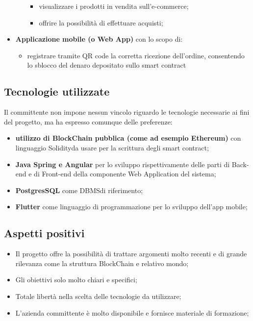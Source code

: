 \begin{itemize}
\begin{itemize}
			\begin{itemize}
				\item visualizzare i prodotti in vendita sull'e-commerce;
				\item offrire la possibilità di effettuare acquisti;
			\end{itemize}
		\end{itemize}
	\item \textbf{Applicazione mobile (o Web App)} con lo scopo di:
		\begin{itemize}
			\item registrare tramite QR code la corretta ricezione dell'ordine, consentendo lo sblocco del denaro depositato sullo smart contract
		\end{itemize}
\end{itemize}

\subsection{Tecnologie utilizzate}
Il committente non impone nessun vincolo riguardo le tecnologie necessarie ai fini del progetto, ma ha espresso comunque delle preferenze:
\begin{itemize}
	\item \textbf{utilizzo di BlockChain pubblica (come ad esempio Ethereum\glo)} con linguaggio Solidity\glo da usare per la scrittura degli {smart contract}\glo;
	\item \textbf{Java Spring e Angular} per lo sviluppo rispettivamente delle parti di Back-end e di Front-end della componente Web Application del sistema;
	\item \textbf{PostgresSQL} come DBMS\glo di riferimento;
	\item \textbf{Flutter} come linguaggio di programmazione per lo sviluppo dell'app mobile;
\end{itemize}

\subsection{Aspetti positivi}
\begin{itemize}
	\item Il progetto offre la possibilità di trattare argomenti molto recenti e di grande rilevanza come la struttura BlockChain e relativo mondo;
	\item Gli obiettivi solo molto chiari e specifici;
	\item Totale libertà nella scelta delle tecnologie da utilizzare;
	\item L'azienda committente è molto disponibile e fornisce materiale di formazione;
\end{itemize}

